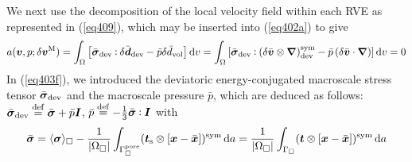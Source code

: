 \documentclass[10pt,a4paper]{article}
\newcommand{\pore}{\mathrm{pore}}
\begin{document}
We next use the decomposition of the local velocity field within each RVE as represented in (\ref{eq409}), which may be inserted into (\ref{eq402a}) to give 
\begin{equation}
    a(\boldsymbol{v},p; \delta \boldsymbol{v}^{\mathrm{M}}) =
    \int_\Omega
    \left[\bar{\boldsymbol{\sigma}}_{\mathrm{dev}} \mathbin{\vcentcolon} \delta\bar{\boldsymbol{d}}_{\mathrm{dev}} -
    \bar{p}\delta\bar{d}_{\mathrm{vol}}\right] \operatorname{d \!} v =
    \int_\Omega
    \left[\bar{\boldsymbol{\sigma}}_{\mathrm{dev}} \mathbin{\vcentcolon} \left(\delta\bar{\boldsymbol{v}}\mathbin{\otimes}\boldsymbol{\nabla}\right)^{\mathrm{sym}}_{\mathrm{dev}} -
    \bar{p}\left(\delta\bar{\boldsymbol{v}}\cdot\boldsymbol{\nabla}\right)\right] 
    \operatorname{d \!} v = 0
    \label{eq403f}
\end{equation}
In (\ref{eq403f}), we introduced the deviatoric energy-conjugated macroscale stress tensor $\bar{\boldsymbol{\sigma}}_{\mathrm{dev}}$ and the macroscale pressure $\bar{p}$, which are deduced as follows: $\bar{\boldsymbol{\sigma}}_{\mathrm{dev}}\overset{\mathrm{def}}{=}\bar{\boldsymbol{\sigma}}+\bar{p}\boldsymbol{I}$, $\bar{p}\overset{\mathrm{def}}{=}-\frac{1}{3}\bar{\boldsymbol{\sigma}}\mathbin{\vcentcolon}\boldsymbol{I}$ with
\begin{equation}
    \bar{\ts\sigma} =
    \langle \ts{\sigma} \rangle_\Box - 
    \frac{1}{|\Omega_\Box|}\int_{\Gamma_\Box^\pore} (\ta{t}_\fluct\outerp[\ta{x}-\bar{\ta{x}}])^\sym \dif a =
    \frac{1}{|\Omega_\Box|}\int_{\Gamma_\Box} (\ta{t}\outerp[\ta{x}-\bar{\ta{x}}])^\sym \dif a
\label{eq411a}
\end{equation}
\end{document}
